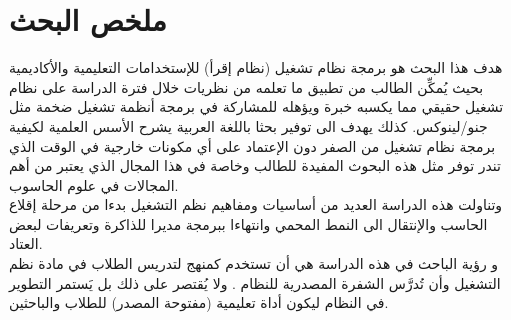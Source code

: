 \documentclass[document.tex]{subfiles}
\begin{document}
\chapter*{ملخص البحث}
هدف هذا البحث هو برمجة نظام تشغيل (نظام إقرأ) للإستخدامات التعليمية والأكاديمية بحيث يُمكِّن الطالب من تطبيق ما تعلمه من نظريات خلال فترة الدراسة على نظام تشغيل حقيقي مما يكسبه خبرة ويؤهله للمشاركة في برمجة أنظمة تشغيل ضخمة مثل جنو/لينوكس. كذلك يهدف الى توفير بحثا باللغة العربية يشرح الأسس العلمية لكيفية برمجة نظام تشغيل من الصفر دون الإعتماد على أي مكونات خارجية في الوقت الذي تندر توفر مثل هذه البحوث المفيدة للطالب وخاصة في هذا المجال الذي يعتبر من أهم المجالات في علوم الحاسوب.\\

وتناولت هذه الدراسة العديد من أساسيات ومفاهيم نظم التشغيل بدءا من مرحلة إقلاع الحاسب والإنتقال الى النمط المحمي وانتهاءا ببرمجة مديرا للذاكرة وتعريفات لبعض العتاد.\\
 
 و رؤية الباحث في هذه الدراسة هي أن تستخدم كمنهج لتدريس الطلاب في مادة نظم التشغيل وأن تُدرَّس الشفرة المصدرية للنظام . ولا يُقتصر على ذلك بل يَستمر التطوير في النظام ليكون أداة تعليمية (مفتوحة المصدر) للطلاب والباحثين.
\end{document}
